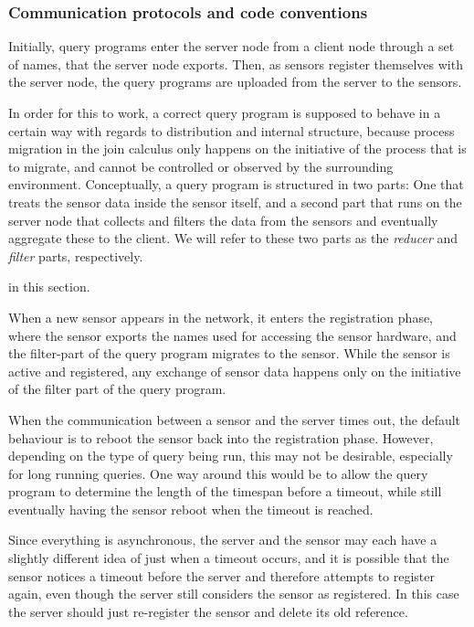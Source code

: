 \subsubsection{Communication protocols and code conventions}

Initially, query programs enter the server node from a client node
through a set of names, that the server node exports.
Then, as sensors register themselves with the server node, the query
programs are uploaded from the server to the sensors.

In order for this to work, a correct query program is supposed to
behave in a certain way with regards to distribution and internal
structure, because process migration in the join calculus only happens on
the initiative of the process that is to migrate, and cannot be controlled
or observed by the surrounding environment.
Conceptually, a query program is structured in two parts: One that
treats the sensor data inside the sensor itself, and a second part
that runs on the server node that collects and filters the data from
the sensors and eventually aggregate these to the client. We will refer
to these two parts as the \emph{reducer} and \emph{filter} parts, respectively.

in this section.

When a new sensor appears in the network, it enters the registration
phase, where the sensor exports the names used for accessing the 
sensor hardware, and the filter-part of the query program migrates to
the sensor.
While the sensor is active and registered, any exchange of sensor data
happens only on the initiative of the filter part of the query
program.

When the communication between a sensor and the server times out, the
default behaviour is to reboot the sensor back into the registration
phase.
However, depending on the type of query being run, this may not be desirable,
especially for long running queries.
One way around this would be to allow the query program to determine
the length of the timespan before a timeout, while still eventually 
having the sensor reboot when the timeout is reached.

Since everything is asynchronous, the server and the sensor may each
have a slightly different idea of just when a timeout occurs, and it
is possible that the sensor notices a timeout before the server and
therefore attempts to register again, even though the server still
considers the sensor as registered. In this case the server should
just re-register the sensor and delete its old reference.

